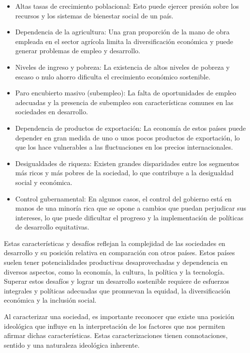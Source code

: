 \documentclass[
  jou,
  floatsintext,
  longtable,
  a4paper,
  nolmodern,
  notxfonts,
  notimes,
  12pt,
  colorlinks=true,linkcolor=blue,citecolor=blue,urlcolor=blue]{apa7}
\providecommand{\tightlist}{%
  \setlength{\itemsep}{0pt}\setlength{\parskip}{0pt}}
\begin{document}
\begin{itemize}
\tightlist
\item
  Altas tasas de crecimiento poblacional: Esto puede ejercer presión
  sobre los recursos y los sistemas de bienestar social de un país.
\item
  Dependencia de la agricultura: Una gran proporción de la mano de obra
  empleada en el sector agrícola limita la diversificación económica y
  puede generar problemas de empleo y desarrollo.
\item
  Niveles de ingreso y pobreza: La existencia de altos niveles de
  pobreza y escaso o nulo ahorro dificulta el crecimiento económico
  sostenible.
\item
  Paro encubierto masivo (subempleo): La falta de oportunidades de
  empleo adecuadas y la presencia de subempleo son características
  comunes en las sociedades en desarrollo.
\item
  Dependencia de productos de exportación: La economía de estos países
  puede depender en gran medida de uno o unos pocos productos de
  exportación, lo que los hace vulnerables a las fluctuaciones en los
  precios internacionales.
\item
  Desigualdades de riqueza: Existen grandes disparidades entre los
  segmentos más ricos y más pobres de la sociedad, lo que contribuye a
  la desigualdad social y económica.
\item
  Control gubernamental: En algunos casos, el control del gobierno está
  en manos de una minoría rica que se opone a cambios que puedan
  perjudicar sus intereses, lo que puede dificultar el progreso y la
  implementación de políticas de desarrollo equitativas.
\end{itemize}

Estas características y desafíos reflejan la complejidad de las
sociedades en desarrollo y su posición relativa en comparación con otros
países. Estos países suelen tener potencialidades productivas
desaprovechadas y dependencia en diversos aspectos, como la economía, la
cultura, la política y la tecnología. Superar estos desafíos y lograr un
desarrollo sostenible requiere de esfuerzos integrales y políticas
adecuadas que promuevan la equidad, la diversificación económica y la
inclusión social.

Al caracterizar una sociedad, es importante reconocer que existe una
posición ideológica que influye en la interpretación de los factores que
nos permiten afirmar dichas características. Estas caracterizaciones
tienen connotaciones, sentido y una naturaleza ideológica inherente.
\end{document}

